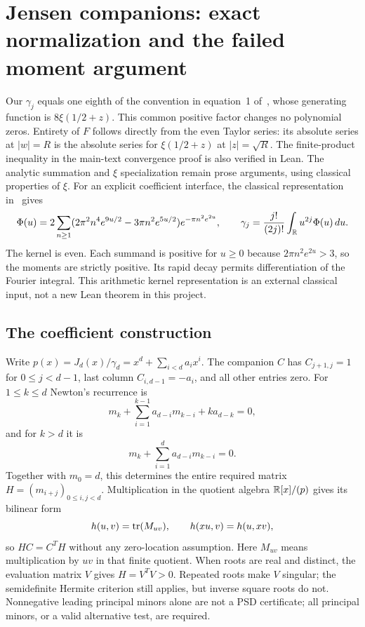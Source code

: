 \section{Jensen companions: exact normalization and the failed moment argument}
Our $\gamma_j$ equals one eighth of the convention in equation~1
of~\cite{jensen}, whose generating function is $8\xi(1/2+z)$.
This common positive factor changes no polynomial zeros. Entirety of
$F$ follows directly from the even Taylor series: its absolute series
at $|w|=R$ is the absolute series for $\xi(1/2+z)$ at $|z|=\sqrt R$.
The finite-product inequality in the main-text convergence proof is
also verified in Lean. The analytic summation and $\xi$ specialization
remain prose arguments, using classical properties of $\xi$.
For an explicit coefficient interface, the classical representation
in~\cite[equations 1.8--1.11]{romik} gives
\[
 \Phi(u)=2\sum_{n\ge1}
 (2\pi^2 n^4 e^{9u/2}-3\pi n^2e^{5u/2})e^{-\pi n^2e^{2u}},\qquad
 \gamma_j=\frac{j!}{(2j)!}\int_{\mathbb R}u^{2j}\Phi(u)\,du.
\]
The kernel is even. Each summand is positive for $u\ge0$ because
$2\pi n^2e^{2u}>3$, so the moments are strictly positive.
Its rapid decay permits differentiation of the Fourier integral.
This arithmetic kernel representation is an external classical input,
not a new Lean theorem in this project.

\subsection{The coefficient construction}
Write $p(x)=J_d(x)/\gamma_d=x^d+\sum_{i<d}a_ix^i$.
The companion $C$ has $C_{j+1,j}=1$ for $0\le j<d-1$,
last column $C_{i,d-1}=-a_i$, and all other entries zero.
For $1\le k\le d$ Newton's recurrence is
\[
 m_k+\sum_{i=1}^{k-1}a_{d-i}m_{k-i}+ka_{d-k}=0,
\]
and for $k>d$ it is
\[
 m_k+\sum_{i=1}^d a_{d-i}m_{k-i}=0.
\]
Together with $m_0=d$, this determines the entire required matrix
$H=(m_{i+j})_{0\le i,j<d}$. Multiplication in the quotient algebra
$\mathbb R[x]/(p)$ gives its bilinear form
\[
 h(u,v)=\operatorname{tr}(M_{uv}),\qquad h(xu,v)=h(u,xv),
\]
so $HC=C^TH$ without any zero-location assumption.
Here $M_{uv}$ means multiplication by $uv$ in that finite quotient.
When roots are real and distinct, the evaluation matrix $V$ gives
$H=V^TV>0$. Repeated roots make $V$ singular; the semidefinite
Hermite criterion still applies, but inverse square roots do not.
Nonnegative leading principal minors alone are not a PSD certificate;
all principal minors, or a valid alternative test, are required.

